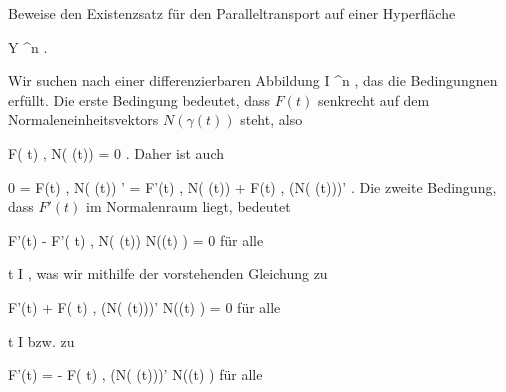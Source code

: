 {

Beweise den Existenzsatz für den Paralleltransport auf einer Hyperfläche

\mavergleichskette
{\vergleichskette
{ Y
}
{ \subseteq }{ \R^n
}
{  }{
}
{    }{
}
{   }{
}
}
{}{}{.}

}
{

Wir suchen nach einer differenzierbaren Abbildung
 { I } { \R^n
} {,}
das die Bedingungnen
erfüllt. Die erste Bedingung bedeutet, dass $F(t)$ senkrecht auf dem Normaleneinheitsvektors $N (\gamma(t))$ steht, also

\mavergleichskettedisp
{\vergleichskette
{ \left\langle F( t) ,  N( \gamma(t))   \right\rangle
}
{ =} { 0
}
{ } {
}
{ } {
}
{ } {
}
}
{}{}{.}
Daher ist auch

\mavergleichskettedisp
{\vergleichskette
{ 0
}
{ =} { \left\langle F(t)  ,  N( \gamma(t))   \right\rangle'
}
{ =} { \left\langle F'(t)  ,  N( \gamma(t))   \right\rangle +  \left\langle F(t)  ,  (N( \gamma(t)))'   \right\rangle
}
{ } {
}
{ } {
}
}
{}{}{.}
Die zweite Bedingung, dass $F'(t)$ im Normalenraum liegt, bedeutet

\mavergleichskettedisp
{\vergleichskette
{ F'(t) - \left\langle F'( t) ,  N( \gamma(t))   \right\rangle N(\gamma(t) )
}
{ =} { 0
}
{ } {
}
{ } {
}
{ } {
}
}
{}{}{}
für alle

\mavergleichskette
{\vergleichskette
{ t
}
{ \in }{ I
}
{  }{
}
{    }{
}
{   }{
}
}
{}{}{,}
was wir mithilfe der vorstehenden Gleichung zu

\mavergleichskettedisp
{\vergleichskette
{ F'(t) + \left\langle F( t) ,  (N( \gamma(t)))'   \right\rangle N(\gamma(t) )
}
{ =} { 0
}
{ } {
}
{ } {
}
{ } {
}
}
{}{}{}
für alle

\mavergleichskette
{\vergleichskette
{ t
}
{ \in }{ I
}
{  }{
}
{    }{
}
{   }{
}
}
{}{}{}
bzw. zu

\mavergleichskettedisp
{\vergleichskette
{ F'(t)
}
{ =} { - \left\langle F( t) ,  (N( \gamma(t)))'   \right\rangle N(\gamma(t) )
}
{ } {
}
{ } {
}
{ } {
}
}
{}{}{}
für alle

}
